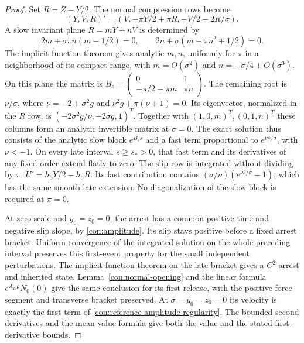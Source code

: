 \begin{proof}
Set $R=\bar Z-\bar Y/2$.  The normal compression rows become
\[
 (Y,V,R)'=(V,-\pi Y/2+\pi R,-V/2-2R/\sigma).
\]
A slow invariant plane $R=mY+nV$ is determined by
\[
 2m+\sigma\pi n(m-1/2)=0,\qquad
 2n+\sigma(m+\pi n^2+1/2)=0.
\]
The implicit function theorem gives analytic $m,n$, uniformly for
$\pi$ in a neighborhood of its compact range, with
$m=O(\sigma^2)$ and $n=-\sigma/4+O(\sigma^3)$.
On this plane the matrix is
$B_s=\left(\begin{smallmatrix}0&1\\-\pi/2+\pi m&\pi n\end{smallmatrix}\right)$.
The remaining root is $\nu/\sigma$, where
$\nu=-2+\sigma^2g$ and
$\nu^2g+\pi(\nu+1)=0$.  Its eigenvector, normalized in the $R$ row,
is $(-2\sigma^2g/\nu,-2\sigma g,1)^T$.
Together with $(1,0,m)^T,(0,1,n)^T$ these columns form an analytic
invertible matrix at $\sigma=0$.
The exact solution thus consists of the analytic slow block
$e^{B_ss}$ and a fast term proportional to $e^{\nu s/\sigma}$,
with $\nu<-1$.  On every late interval $s\ge s_*>0$, that fast term
and its derivatives of any fixed order extend flatly to zero.
The slip row is integrated without dividing by $\pi$:
$U'=h_0Y/2-h_0R$.  Its fast contribution contains
$(\sigma/\nu)(e^{\nu s/\sigma}-1)$, which has the same smooth late
extension.  No diagonalization of the slow block is required at
$\pi=0$.

At zero scale and $y_0=z_0=0$, the arrest has a common positive time
and negative slip slope, by \eqref{con:amplitude}.  Its slip stays
positive before a fixed arrest bracket.  Uniform convergence of the
integrated solution on the whole preceding interval preserves this
first-event property for the small independent perturbations.
The implicit function theorem on the late bracket gives a $C^2$
arrest and inherited state.  Lemma~\ref{con:normal-opening} and the
linear formula $e^{A_D\rho}N_0(0)$ give the same conclusion for its
first release, with the positive-force segment and transverse bracket
preserved.  At $\sigma=y_0=z_0=0$ its velocity is exactly the first
term of \eqref{con:reference-amplitude-regularity}.
The bounded second derivatives and the mean value formula give both
the value and the stated first-derivative bounds.
\end{proof}


